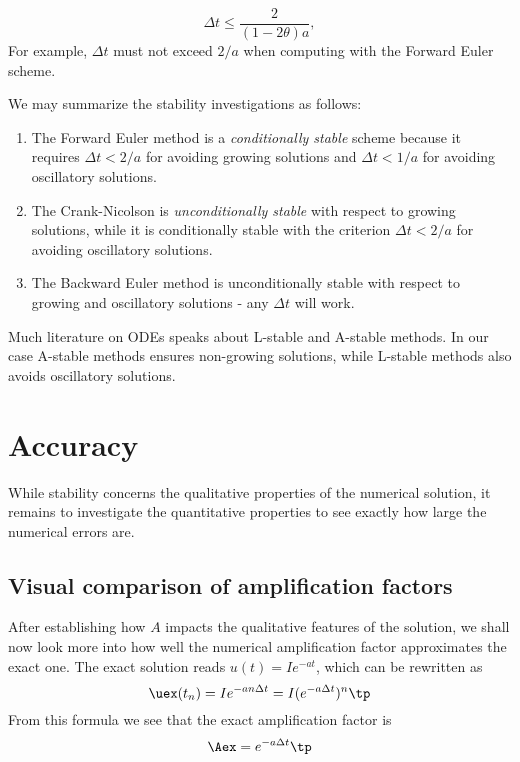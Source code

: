 \documentclass[graybox,sectrefs,envcountresetchap,open=right,final]{svmonodo}
\newenvironment{notice_mdfboxadmon}[1][]{
\begin{notice_mdfboxmdframed}[frametitle=#1]
}
{
\end{notice_mdfboxmdframed}
}
\begin{document}
\begin{equation}
\Delta t \leq \frac{2}{(1-2\theta)a},
\end{equation}
For example, $\Delta t$ must not exceed  $2/a$ when computing with
the Forward Euler scheme.



\begin{notice_mdfboxadmon}
We may summarize the stability investigations as follows:

\begin{enumerate}
\item The Forward Euler method is a \emph{conditionally stable} scheme because it requires $\Delta t < 2/a$ for avoiding growing solutions and $\Delta t < 1/a$ for avoiding oscillatory solutions.

\item The Crank-Nicolson is \emph{unconditionally stable} with respect to growing solutions, while it is conditionally stable with the criterion $\Delta t < 2/a$ for avoiding oscillatory solutions.

\item The Backward Euler method is unconditionally stable with respect to growing and oscillatory solutions - any $\Delta t$ will work.
\end{enumerate}

\noindent
Much literature on ODEs speaks about L-stable and A-stable methods.
In our case A-stable methods ensures non-growing solutions, while
L-stable methods also avoids oscillatory solutions.
\end{notice_mdfboxadmon} %



\section{Accuracy}

While stability concerns the qualitative properties of the numerical
solution, it remains to investigate the quantitative properties to
see exactly how large the numerical errors are.

\subsection{Visual comparison of amplification factors}

After establishing how $A$ impacts the qualitative features of the
solution, we shall now look more into how well the numerical amplification
factor approximates the exact one. The exact solution reads
$u(t)=Ie^{-at}$, which can be rewritten as
\begin{equation}
{\uex}(t_n) = Ie^{-a n\Delta t} = I(e^{-a\Delta t})^n \tp
\end{equation}
From this formula we see that the exact amplification factor is
\begin{equation}
\Aex = e^{-a\Delta t} \tp
\end{equation}
\end{document}
